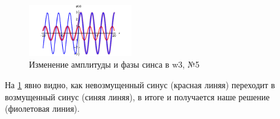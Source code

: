 \begin{figure}[ht]
    \centering
    \includegraphics[width=0.4\textwidth]{figures/w3.pdf}
    \caption{Изменение амплитуды и фазы синса в w3, №5 }
    \label{fig:w3}
\end{figure}

На \ref{fig:w3} явно видно, как невозмущенный синус (красная линяя) переходит в возмущенный синус (синяя линяя), в итоге и получается наше решение (фиолетовая линия). 
